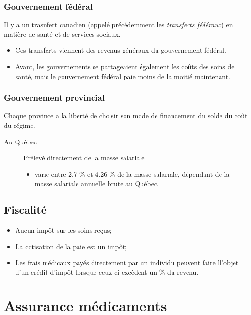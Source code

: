 \documentclass[10pt, french]{article}
\begin{document}
\begin{multicols*}{3}
	\subsubsection*{Gouvernement fédéral}
	Il y a un trasnfert canadien (appelé précédemment les \textit{transferts fédéraux}) en matière de santé et de services sociaux.
	\begin{itemize}
	\item	Ces transferts viennent des revenus généraux du gouvernement fédéral.
	\item 	Avant, les gouvernements se partageaient également les coûts des soins de santé, mais le gouvernement fédéral paie moins de la moitié maintenant.
	\end{itemize}
	\subsubsection*{Gouvernement provincial}
	Chaque province a la liberté de choisir son mode de financement du solde du coût du régime.
	\begin{description}
	\item[Au Québec] Prélevé directement de la masse salariale
		\begin{itemize}
		\item 	varie entre 2.7 \% et 4.26 \% de la masse salariale, dépendant de la masse salariale annuelle brute au Québec.
		\end{itemize}
	\end{description}


\subsection{Fiscalité}
\begin{itemize}
\item	Aucun impôt sur les soins reçus;
\item	La cotisation de la paie est un impôt;
\item	Les frais médicaux payés directement par un individu peuvent faire ll'objet d'un crédit d'impôt lorsque ceux-ci excèdent un \% du revenu.
\end{itemize}




\newpage
\section{Assurance médicaments}


\end{multicols*}
\end{document}
